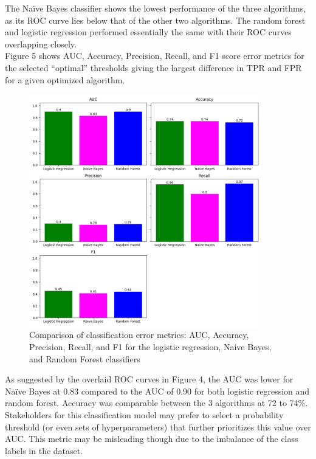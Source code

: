\documentclass[11pt]{article}
\begin{document}
The Naïve Bayes classifier shows the lowest performance of the three algorithms, as its ROC curve lies below that of the other two algorithms. The random forest and logistic regression performed essentially the same with their ROC curves overlapping closely. \\
 
Figure 5 shows AUC, Accuracy, Precision, Recall, and F1 score error metrics for the selected “optimal” thresholds giving the largest difference in TPR and FPR for a given optimized algorithm. \\
 
\begin{figure}[H]
\centering
\includegraphics[width = 0.9\textwidth]{error_metrics_bar_charts.png} 
\caption{ Comparison of classification error metrics: AUC, Accuracy, Precision, Recall, and F1 for the logistic regression, Naive Bayes, and Random Forest classifiers}
\label{ROC}
\end{figure}


As suggested by the overlaid ROC curves in Figure 4, the AUC was lower for Naïve Bayes at 0.83 compared to the AUC of 0.90 for both logistic regression and random forest.  
Accuracy was comparable between the 3 algorithms at 72 to 74\%. Stakeholders for this classification model may prefer to select a probability threshold (or even sets of hyperparameters) that further prioritizes this value over AUC. This metric may be misleading though due to the imbalance of the class labels in the dataset. \\
\end{document}

